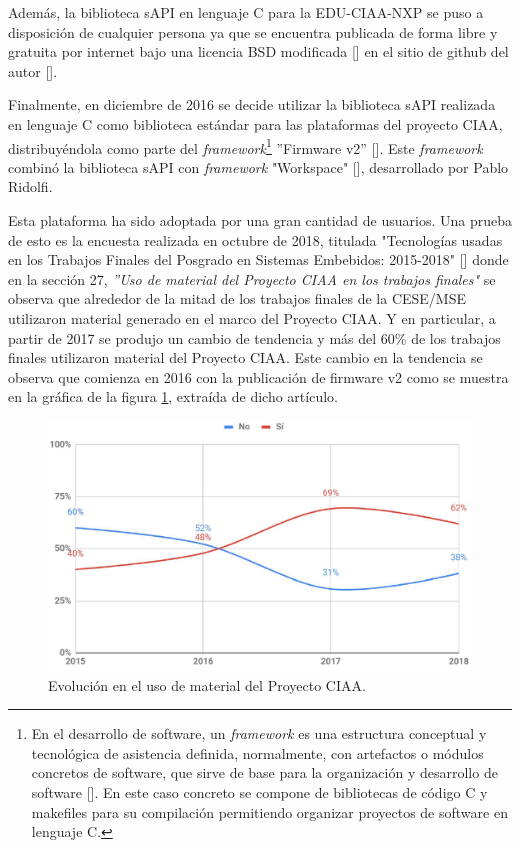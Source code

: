 Además, la biblioteca sAPI en lenguaje C para la EDU-CIAA-NXP se puso a disposición de cualquier persona ya que se encuentra publicada de forma libre y gratuita por internet bajo una licencia BSD modificada [] en el sitio de github del autor [].

Finalmente, en diciembre de 2016 se decide utilizar la biblioteca sAPI realizada en lenguaje C como biblioteca estándar para las plataformas del proyecto CIAA, distribuyéndola como parte del \emph{framework}\footnote{En el desarrollo de software, un \emph{framework} es una estructura conceptual y tecnológica de asistencia definida, normalmente, con artefactos o módulos concretos de software, que sirve de base para la organización y desarrollo de software []. En este caso concreto se compone de bibliotecas de código C y makefiles para su compilación permitiendo organizar proyectos de software en lenguaje C.} ''Firmware v2'' []. Este \emph{framework} combinó la biblioteca sAPI con \emph{framework} "Workspace" [], desarrollado por Pablo Ridolfi.

Esta plataforma ha sido adoptada por una gran cantidad de usuarios. Una prueba de esto es la encuesta realizada en octubre de 2018, titulada "Tecnologías usadas en los Trabajos Finales del Posgrado en Sistemas Embebidos: 2015-2018" [] donde en la sección 27, \emph{''Uso de material del Proyecto CIAA en los trabajos finales"} se observa que alrededor de la mitad de los trabajos finales de la CESE/MSE utilizaron material generado en el marco del Proyecto CIAA. Y en particular, a partir de 2017 se produjo un cambio de tendencia y más del 60\% de los trabajos finales utilizaron material del Proyecto CIAA. Este cambio en la tendencia se observa que comienza en 2016 con la publicación de firmware v2 como se muestra en la gráfica de la figura \ref{fig:tendenciaMaterialCiaa}, extraída de dicho artículo.

\begin{figure}[!htbp]
\begin{center}  %
\includegraphics*[width=12cm]{Figures/TendenciaMaterialCiaa.png}
\par\caption{Evolución en el uso de material del Proyecto CIAA.}\label{fig:tendenciaMaterialCiaa}
\end{center}
\end{figure}

